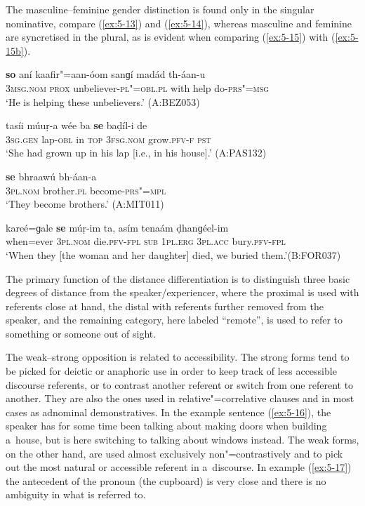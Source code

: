 The masculine--feminine gender distinction is found only in the singular nominative, compare (\ref{ex:5-13}) and (\ref{ex:5-14}), whereas masculine and feminine are syncretised in the plural, as is evident when comparing (\ref{ex:5-15}) with (\ref{ex:5-15b}). 


\begin{exe}
\ex
\label{ex:5-13}
\gll \textbf{so} aní kaafir"=aan-óom sanɡí madád th-áan-u \\
\textsc{3msg}.\textsc{nom} \textsc{prox} unbeliever-\textsc{pl"=obl.pl} with help do-\textsc{prs"=msg}\\
\glt `He is helping these unbelievers.' (A:BEZ053)

\ex
\label{ex:5-14}
\gll tasíi múuṛ-a wée ba \textbf{se} baḍíl-i de \\
\textsc{3sg}.\textsc{gen} lap-\textsc{obl} in \textsc{top} \textsc{3fsg}.\textsc{nom}
grow.\textsc{pfv-f} \textsc{pst}\\
\glt `She had grown up in his lap [i.e., in his house].' (A:PAS132)

\ex
\label{ex:5-15}
\gll \textbf{se} bhraawú bh-áan-a\\
\textsc{3pl}.\textsc{nom} brother.\textsc{pl} become-\textsc{prs"=mpl}\\
\glt `They become brothers.' (A:MIT011)

\ex
\label{ex:5-15b}
\gll kareé=ɡale \textbf{se} múṛ-im ta, asím  tenaám ḍhanɡéel-im\\
when=ever \textsc{3pl.nom} die.\textsc{pfv}-\textsc{fpl} \textsc{sub} \textsc{1pl.erg} \textsc{3pl.acc} bury.\textsc{pfv}-\textsc{fpl} \\
\glt `When they [the woman and her daughter] died, we buried them.'\newline (B:FOR037)
\end{exe}


The primary function of the distance differentiation is to distinguish three basic degrees of distance from the speaker/experiencer, where the proximal is used with referents close at hand, the distal with referents further removed from the speaker, and the remaining category, here labeled ``remote'', is used to refer to something or someone out of sight. 


The weak--strong opposition is related to accessibility. The strong forms tend to be picked for deictic or anaphoric use in order to keep track of less accessible discourse referents, or to contrast another referent or switch from one referent to another. They are also the ones used in relative"=correlative clauses and in most cases as adnominal demonstratives. In the example sentence (\ref{ex:5-16}), the speaker has for some time been talking about making doors when building a~house, but is here switching to talking about windows instead. The weak forms, on the other hand, are used almost exclusively non"=contrastively and to pick out the most natural or accessible referent in a~discourse. In example (\ref{ex:5-17}) the antecedent of the pronoun (the cupboard) is very close and there is no ambiguity in what is referred to.


